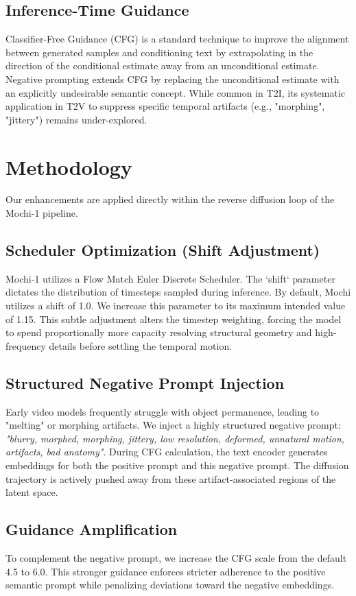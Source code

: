 \documentclass[10pt, conference]{IEEEtran}
\begin{document}
\subsection{Inference-Time Guidance}
Classifier-Free Guidance (CFG) is a standard technique to improve the alignment between generated samples and conditioning text by extrapolating in the direction of the conditional estimate away from an unconditional estimate. Negative prompting extends CFG by replacing the unconditional estimate with an explicitly undesirable semantic concept. While common in T2I, its systematic application in T2V to suppress specific temporal artifacts (e.g., "morphing", "jittery") remains under-explored.

\section{Methodology}
Our enhancements are applied directly within the reverse diffusion loop of the Mochi-1 pipeline.

\subsection{Scheduler Optimization (Shift Adjustment)}
Mochi-1 utilizes a Flow Match Euler Discrete Scheduler. The `shift` parameter dictates the distribution of timesteps sampled during inference. By default, Mochi utilizes a shift of 1.0. We increase this parameter to its maximum intended value of 1.15. This subtle adjustment alters the timestep weighting, forcing the model to spend proportionally more capacity resolving structural geometry and high-frequency details before settling the temporal motion. 

\subsection{Structured Negative Prompt Injection}
Early video models frequently struggle with object permanence, leading to "melting" or morphing artifacts. We inject a highly structured negative prompt: \textit{"blurry, morphed, morphing, jittery, low resolution, deformed, unnatural motion, artifacts, bad anatomy"}. During CFG calculation, the text encoder generates embeddings for both the positive prompt and this negative prompt. The diffusion trajectory is actively pushed away from these artifact-associated regions of the latent space.

\subsection{Guidance Amplification}
To complement the negative prompt, we increase the CFG scale from the default 4.5 to 6.0. This stronger guidance enforces stricter adherence to the positive semantic prompt while penalizing deviations toward the negative embeddings.
\end{document}
